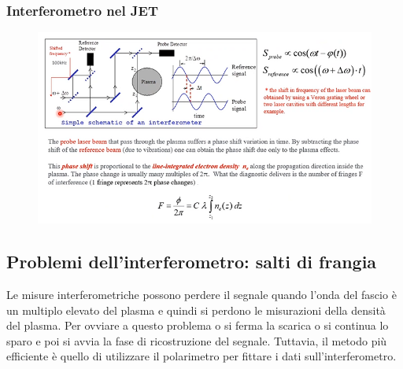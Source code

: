 \documentclass{article}
\begin{document}
\subsubsection{Interferometro nel JET}
\begin{figure}
	\includegraphics[scale=0.4]{2022-05-29-16-23-12.png}%
\end{figure}
\subsection{Problemi dell'interferometro: salti di frangia}
Le misure interferometriche possono perdere il segnale quando l'onda del fascio è un multiplo elevato del plasma e quindi si perdono le misurazioni della densità del plasma. Per ovviare a questo problema o si ferma la scarica o si continua lo sparo e poi si avvia la fase di ricostruzione del segnale. Tuttavia, il metodo più efficiente è quello di utilizzare il polarimetro per fittare i dati sull'interferometro.
\end{document}
